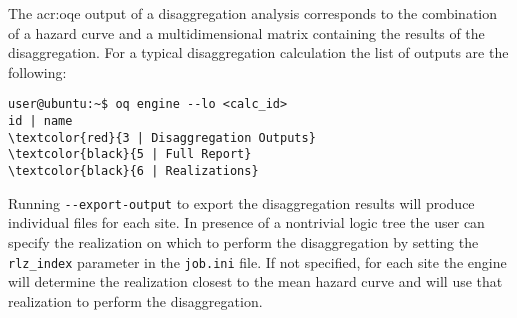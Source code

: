 The \glsdesc{acr:oqe} output of a disaggregation analysis corresponds to the
combination of a hazard curve and a multidimensional matrix containing the
results of the disaggregation. For a typical disaggregation calculation the
list of outputs are the following:

\begin{Verbatim}[frame=single, commandchars=\\\{\}, fontsize=\small]
user@ubuntu:~$ oq engine --lo <calc_id>
id | name
\textcolor{red}{3 | Disaggregation Outputs}
\textcolor{black}{5 | Full Report}
\textcolor{black}{6 | Realizations}
\end{Verbatim}
%

Running \texttt{-{}-export-output} to export the disaggregation results will produce individual files for each site.
In presence of a nontrivial logic tree the user can specify the realization
on which to perform the disaggregation by setting the \texttt{rlz\_index}
parameter in the \texttt{job.ini} file. If not specified, for each site
the engine will determine the realization closest to the mean hazard curve
and will use that realization to perform the disaggregation.
